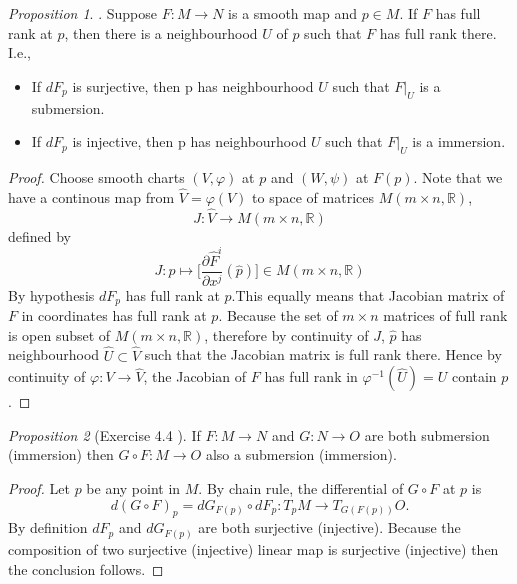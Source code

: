 \documentclass[a4paper]{article}
\theoremstyle{remark}
\newtheorem{prop}{Proposition}
\begin{document}
\begin{prop}
. Suppose $F : M \rightarrow N $ is a smooth map and $p \in M$. If $F$ has full rank at $p$, then there is a neighbourhood $U$ of $p$ such that $F$ has full rank there. I.e.,
\begin{itemize}
\item If $dF_p$ is surjective, then p has neighbourhood $U$ such that $F|_U$ is a submersion.
\item If $dF_p$ is injective, then p has neighbourhood $U$ such that $F|_U$ is a immersion.
\end{itemize}
\end{prop}
\begin{proof}
Choose smooth charts $(V,\varphi)$ at $p$ and $(W,\psi)$ at $F(p)$. Note that we have a continous map from $\hat{V}=\varphi(V)$ to space of matrices $M(m\times n,\mathbb{R})$,
$$
J: \hat{V} \rightarrow M(m\times n,\mathbb{R})
$$
defined by
$$
J : \hat{p} \mapsto \Bigg[\frac{\partial \hat{F}^i}{\partial x^j}(\hat{p})\Bigg] \in M(m\times n,\mathbb{R})
$$
By hypothesis $dF_p$ has full rank at $p$.This equally means that Jacobian matrix of $F$ in coordinates has full rank at $p$.  Because the set of $m\times n$ matrices of full rank is open subset of $M(m\times n, \mathbb{R})$, therefore by continuity of $J$, $\hat{p}$ has neighbourhood $\hat{U} \subset \hat{V}$ such that the Jacobian matrix is full rank there. Hence by continuity of $\varphi : V \rightarrow \hat{V}$, the Jacobian of $F$ has full rank in $\varphi^{-1}(\hat{U}) = U$ contain $p$. 
\end{proof}

\begin{prop}[Exercise 4.4 \cite{LeeSM}]
If $F : M \rightarrow N$ and $G : N \rightarrow O$ are both submersion (immersion) then $G \circ F : M \rightarrow O$ also a submersion (immersion).
\end{prop}
\begin{proof}
Let $p$ be any point in $M$. By chain rule, the differential of $G \circ F$ at $p$ is
$$
d(G \circ F)_p = dG_{F(p)} \circ dF_p : T_pM \rightarrow T_{G(F(p))}O.
$$
By definition $dF_p$ and $dG_{F(p)}$ are both surjective (injective). Because the composition of two surjective (injective) linear map is surjective (injective) then the conclusion follows. 
\end{proof}
\end{document}
